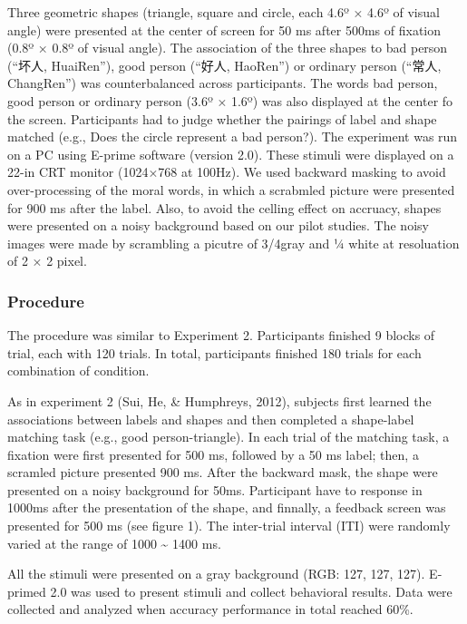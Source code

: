 \documentclass[man]{apa6}
\begin{document}
Three geometric shapes (triangle, square and circle, each 4.6º × 4.6º of visual angle) were presented at the center of screen for 50 ms after 500ms of fixation (0.8º × 0.8º of visual angle). The association of the three shapes to bad person (\enquote{坏人, HuaiRen}), good person (\enquote{好人, HaoRen}) or ordinary person (\enquote{常人, ChangRen}) was counterbalanced across participants. The words bad person, good person or ordinary person (3.6º × 1.6º) was also displayed at the center fo the screen. Participants had to judge whether the pairings of label and shape matched (e.g., Does the circle represent a bad person?). The experiment was run on a PC using E-prime software (version 2.0). These stimuli were displayed on a 22-in CRT monitor (1024×768 at 100Hz).
We used backward masking to avoid over-processing of the moral words, in which a scrabmled picture were presented for 900 ms after the label. Also, to avoid the celling effect on accruacy, shapes were presented on a noisy background based on our pilot studies. The noisy images were made by scrambling a picutre of 3/4gray and ¼ white at resoluation of 2 × 2 pixel.

\hypertarget{procedure-9}{%
\subsubsection{Procedure}\label{procedure-9}}

The procedure was similar to Experiment 2. Participants finished 9 blocks of trial, each with 120 trials. In total, participants finished 180 trials for each combination of condition.

As in experiment 2 (Sui, He, \& Humphreys, 2012), subjects first learned the associations between labels and shapes and then completed a shape-label matching task (e.g., good person-triangle). In each trial of the matching task, a fixation were first presented for 500 ms, followed by a 50 ms label; then, a scramled picture presented 900 ms. After the backward mask, the shape were presented on a noisy background for 50ms. Participant have to response in 1000ms after the presentation of the shape, and finnally, a feedback screen was presented for 500 ms (see figure 1). The inter-trial interval (ITI) were randomly varied at the range of 1000 \textasciitilde{} 1400 ms.

All the stimuli were presented on a gray background (RGB: 127, 127, 127). E-primed 2.0 was used to present stimuli and collect behavioral results. Data were collected and analyzed when accuracy performance in total reached 60\%.
\end{document}
